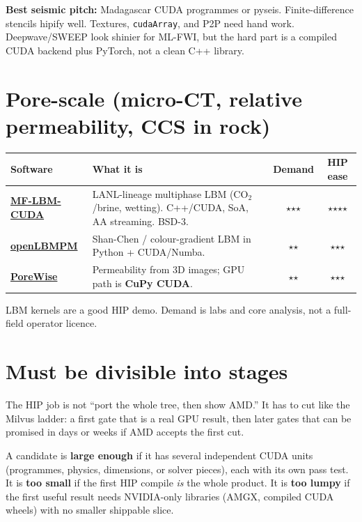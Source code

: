 \documentclass[11pt,a4paper]{article}
\begin{document}
\textbf{Best seismic pitch:} Madagascar CUDA programmes or pyseis.
Finite-difference stencils hipify well.
Textures, \texttt{cudaArray}, and P2P need hand work.
Deepwave/SWEEP look shinier for ML-FWI, but the hard part is a compiled CUDA backend
plus PyTorch, not a clean C++ library.

\section{Pore-scale (micro-CT, relative permeability, CCS in rock)}

\begin{longtable}{@{}p{}p{}cc@{}}
\toprule
Software & What it is & Demand & HIP ease \\
\midrule
\endhead
\href{https://github.com/Mahmoud-Sedahmed/MF-LBM-CUDA}{\textbf{MF-LBM-CUDA}} &
LANL-lineage multiphase LBM (CO$_2$/brine, wetting).
C++/CUDA, SoA, AA streaming.
BSD-3. &
$\star$$\star$$\star$ &
$\star$$\star$$\star$$\star$ \\
\href{https://github.com/PorousMediaSimulation/openLBMPM}{\textbf{openLBMPM}} &
Shan-Chen / colour-gradient LBM in Python + CUDA/Numba. &
$\star$$\star$ &
$\star$$\star$$\star$ \\
\href{https://github.com/SalehMohammadrezaei/LBM-Permeability}{\textbf{PoreWise}} &
Permeability from 3D images; GPU path is \textbf{CuPy CUDA}. &
$\star$$\star$ &
$\star$$\star$$\star$ \\
\bottomrule
\end{longtable}

LBM kernels are a good HIP demo.
Demand is labs and core analysis, not a full-field operator licence.

\section{Must be divisible into stages}

The HIP job is not ``port the whole tree, then show AMD.''
It has to cut like the Milvus ladder: a first gate that is a real GPU result,
then later gates that can be promised in days or weeks if AMD accepts the first cut.

A candidate is \textbf{large enough} if it has several independent CUDA units
(programmes, physics, dimensions, or solver pieces), each with its own pass test.
It is \textbf{too small} if the first HIP compile \emph{is} the whole product.
It is \textbf{too lumpy} if the first useful result needs NVIDIA-only libraries
(AMGX, compiled CUDA wheels) with no smaller shippable slice.
\end{document}
